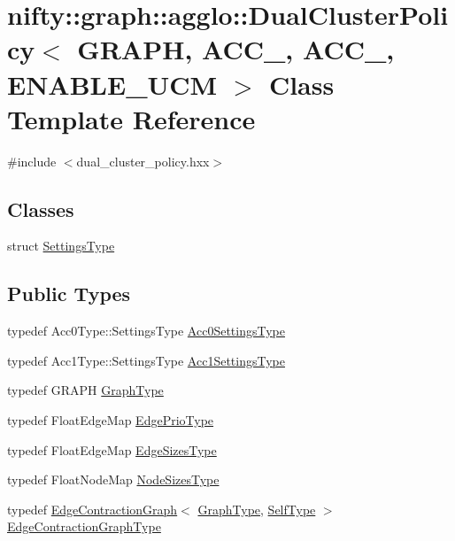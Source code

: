 \hypertarget{classnifty_1_1graph_1_1agglo_1_1DualClusterPolicy}{}\section{nifty\+:\+:graph\+:\+:agglo\+:\+:Dual\+Cluster\+Policy$<$ G\+R\+A\+PH, A\+C\+C\+\_, A\+C\+C\+\_, E\+N\+A\+B\+L\+E\+\_\+\+U\+CM $>$ Class Template Reference}
\label{classnifty_1_1graph_1_1agglo_1_1DualClusterPolicy}


{\ttfamily \#include $<$dual\+\_\+cluster\+\_\+policy.\+hxx$>$}

\subsection*{Classes}
\begin{DoxyCompactItemize}
\item 
struct \hyperlink{structnifty_1_1graph_1_1agglo_1_1DualClusterPolicy_1_1SettingsType}{Settings\+Type}
\end{DoxyCompactItemize}
\subsection*{Public Types}
\begin{DoxyCompactItemize}
\item 
typedef Acc0\+Type\+::\+Settings\+Type \hyperlink{classnifty_1_1graph_1_1agglo_1_1DualClusterPolicy_ac8d246f0a0387bf78fcf9d823496e515}{Acc0\+Settings\+Type}
\item 
typedef Acc1\+Type\+::\+Settings\+Type \hyperlink{classnifty_1_1graph_1_1agglo_1_1DualClusterPolicy_a9e9443784c4c09926fd8c97608547779}{Acc1\+Settings\+Type}
\item 
typedef G\+R\+A\+PH \hyperlink{classnifty_1_1graph_1_1agglo_1_1DualClusterPolicy_ad8e19fe87ad08f4187fdb79c1367389a}{Graph\+Type}
\item 
typedef Float\+Edge\+Map \hyperlink{classnifty_1_1graph_1_1agglo_1_1DualClusterPolicy_a54d7666f80620939d704938530b7564a}{Edge\+Prio\+Type}
\item 
typedef Float\+Edge\+Map \hyperlink{classnifty_1_1graph_1_1agglo_1_1DualClusterPolicy_a7687a1027ad05abe1b32b034cc383003}{Edge\+Sizes\+Type}
\item 
typedef Float\+Node\+Map \hyperlink{classnifty_1_1graph_1_1agglo_1_1DualClusterPolicy_a03e7d4c024b17e4fa6647058bac773dc}{Node\+Sizes\+Type}
\item 
typedef \hyperlink{classnifty_1_1graph_1_1EdgeContractionGraph}{Edge\+Contraction\+Graph}$<$ \hyperlink{classnifty_1_1graph_1_1agglo_1_1DualClusterPolicy_ad8e19fe87ad08f4187fdb79c1367389a}{Graph\+Type}, \hyperlink{classnifty_1_1graph_1_1agglo_1_1DualClusterPolicy}{Self\+Type} $>$ \hyperlink{classnifty_1_1graph_1_1agglo_1_1DualClusterPolicy_a50412f31fd3dc355ef0804cb8d753c05}{Edge\+Contraction\+Graph\+Type}
\end{DoxyCompactItemize}
